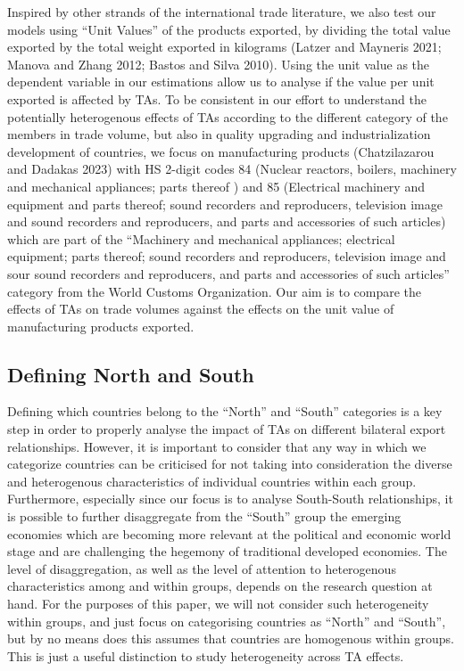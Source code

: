 \documentclass[12pt]{article}%
\begin{document}
%
Inspired by other strands of the international trade literature, we also
test our models using ``Unit Values'' of the products exported, by
dividing the total value exported by the total weight exported in
kilograms (Latzer and Mayneris 2021; Manova and Zhang 2012; Bastos and
Silva 2010). Using the unit value as the dependent variable in our
estimations allow us to analyse if the value per unit exported is
affected by TAs. To be consistent in our effort to understand the
potentially heterogenous effects of TAs according to the different
category of the members in trade volume, but also in quality upgrading
and industrialization development of countries, we focus on
manufacturing products (Chatzilazarou and Dadakas 2023) with HS 2-digit
codes 84 (Nuclear reactors, boilers, machinery and mechanical
appliances; parts thereof ) and 85 (Electrical machinery and equipment
and parts thereof; sound recorders and reproducers, television image and
sound recorders and reproducers, and parts and accessories of such
articles) which are part of the ``Machinery and mechanical appliances;
electrical equipment; parts thereof; sound recorders and reproducers,
television image and sour sound recorders and reproducers, and parts and
accessories of such articles'' category from the World Customs
Organization. Our aim is to compare the effects of TAs on trade volumes
against the effects on the unit value of manufacturing products
exported.
%
\subsection{Defining North and South}%
\label{subsec:DefiningNorthandSouth}%

%
Defining which countries belong to the ``North'' and ``South''
categories is a key step in order to properly analyse the impact of TAs
on different bilateral export relationships. However, it is important to
consider that any way in which we categorize countries can be criticised
for not taking into consideration the diverse and heterogenous
characteristics of individual countries within each group. Furthermore,
especially since our focus is to analyse South-South relationships, it
is possible to further disaggregate from the ``South'' group the
emerging economies which are becoming more relevant at the political and
economic world stage and are challenging the hegemony of traditional
developed economies. The level of disaggregation, as well as the level
of attention to heterogenous characteristics among and within groups,
depends on the research question at hand. For the purposes of this
paper, we will not consider such heterogeneity within groups, and just
focus on categorising countries as ``North'' and ``South'', but by no
means does this assumes that countries are homogenous within groups.
This is just a useful distinction to study heterogeneity across TA
effects.
\end{document}
